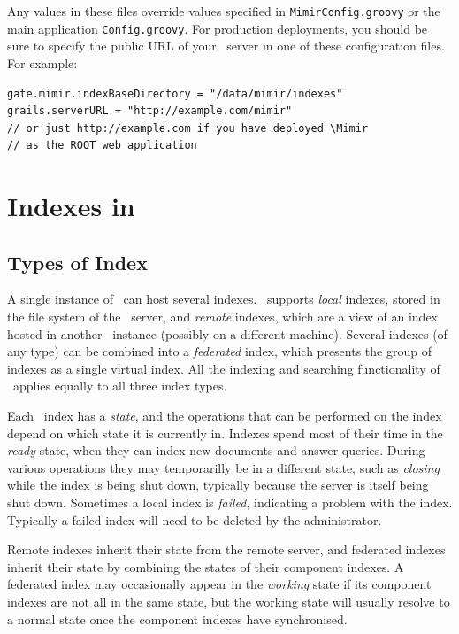 Any values in these files override values specified in {\tt MimirConfig.groovy}
or the main application {\tt Config.groovy}.  For production deployments, you
should be sure to specify the public URL of your \Mimir\ server in one of these
configuration files.  For example:
\begin{lstlisting}[texcl]
gate.mimir.indexBaseDirectory = "/data/mimir/indexes"
grails.serverURL = "http://example.com/mimir"
// or just http://example.com if you have deployed \Mimir
// as the ROOT web application
\end{lstlisting}

\section{Indexes in \Mimir}

\subsection{Types of Index}\label{sec:admin:index-types}

A single instance of \Mimir\ can host several indexes.  \Mimir\ supports
{\em local} indexes, stored in the file system of the \Mimir\ server, and
{\em remote} indexes, which are a view of an index hosted in another \Mimir\
instance (possibly on a different machine).  Several indexes (of any type) can
be combined into a {\em federated} index, which presents the group of indexes as
a single virtual index.  All the indexing and searching functionality of
\Mimir\ applies equally to all three index types.

Each \Mimir\ index has a {\em state}, and the operations that can be performed
on the index depend on which state it is currently in. Indexes spend most of
their time in the {\em ready} state, when they can index new documents and
answer queries. During various operations they may temporarilly be in a
different state, such as {\em closing} while the index is being shut down,
typically because the \Mimir{} server is itself being shut down. Sometimes a
local index is {\em failed}, indicating a problem with the index.  Typically a
failed index will need to be deleted by the administrator.

Remote indexes inherit their state from the remote server, and federated indexes
inherit their state by combining the states of their component indexes.
A federated index may occasionally appear in the {\em working} state if its
component indexes are not all in the same state, but the working state will
usually resolve to a normal state once the component indexes have synchronised.


